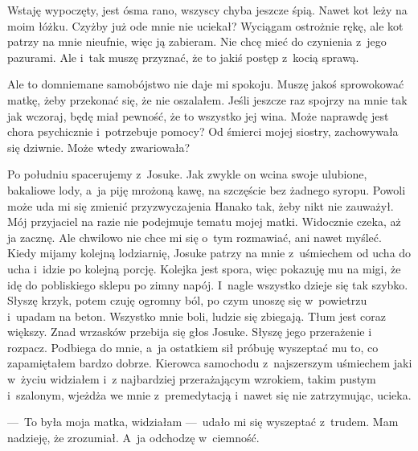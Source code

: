 Wstaję wypoczęty, jest ósma rano, wszyscy chyba jeszcze śpią. Nawet kot leży na moim łóżku. Czyżby już ode mnie nie uciekał? Wyciągam ostrożnie rękę, ale kot patrzy na mnie nieufnie, więc ją zabieram. Nie chcę mieć do czynienia z~jego pazurami. Ale i~tak muszę przyznać, że to jakiś postęp z~kocią sprawą.  

Ale to domniemane samobójstwo nie daje mi spokoju. Muszę jakoś sprowokować matkę, żeby przekonać się, że nie oszalałem. Jeśli jeszcze raz spojrzy na mnie tak jak wczoraj, będę miał pewność, że to wszystko jej wina. Może naprawdę jest chora psychicznie i~potrzebuje pomocy? Od śmierci mojej siostry, zachowywała się dziwnie. Może wtedy zwariowała?  

Po południu spacerujemy z~Josuke. Jak zwykle on wcina swoje ulubione, bakaliowe lody, a~ja piję mrożoną kawę, na szczęście bez żadnego syropu. Powoli może uda mi się zmienić przyzwyczajenia Hanako tak, żeby nikt nie zauważył. Mój przyjaciel na razie nie podejmuje tematu mojej matki. Widocznie czeka, aż ja zacznę. Ale chwilowo nie chce mi się o~tym rozmawiać, ani nawet myśleć. Kiedy mijamy kolejną lodziarnię, Josuke patrzy na mnie z~uśmiechem od ucha do ucha i~idzie po kolejną porcję. Kolejka jest spora, więc pokazuję mu na migi, że idę do pobliskiego sklepu po zimny napój. I~nagle wszystko dzieje się tak szybko. Słyszę krzyk, potem czuję ogromny ból, po czym unoszę się w~powietrzu i~upadam na beton. Wszystko mnie boli, ludzie się zbiegają. Tłum jest coraz większy. Znad wrzasków przebija się głos Josuke. Słyszę jego przerażenie i~ rozpacz. Podbiega do mnie, a~ja ostatkiem sił próbuję wyszeptać mu to, co zapamiętałem bardzo dobrze. Kierowca samochodu z~najszerszym uśmiechem jaki w~życiu widziałem i~z najbardziej przerażającym wzrokiem, takim pustym i~szalonym, wjeżdża we mnie z~premedytacją i~nawet się nie zatrzymując, ucieka. 

---~To była moja matka, widziałam ---~udało mi się wyszeptać z~trudem. Mam nadzieję, że zrozumiał. A~ja odchodzę w~ciemność.

